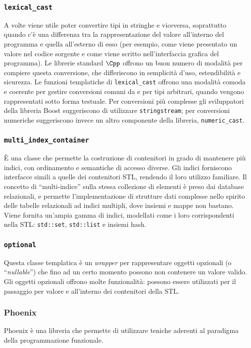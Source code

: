 \subsubsection{{\tt lexical\_cast}}
A volte viene utile poter convertire tipi in stringhe e viceversa,
soprattutto quando c'è una differenza tra la rappresentazione del valore
all'interno del programma e quella all'esterno di esso (per esempio,
come viene presentato un valore nel codice sorgente e come viene scritto
nell'interfaccia grafica del programma).
Le librerie standard $\Cpp$ offrono un buon numero di modalità per
compiere questa conversione, che differiscono in semplicità d'uso,
estendibilità e sicurezza.
Le funzioni templatiche di {\tt lexical\_cast} offrono una modalità
comoda e coerente per gestire conversioni comuni da e per tipi
arbitrari, quando vengono rappresentati sotto forma testuale.
Per conversioni più complesse gli sviluppatori della libreria Boost
suggeriscono di utilizzare {\tt stringstream}; per conversioni numeriche
suggeriscono invece un altro componente della libreria,
{\tt numeric\_cast}.

\subsubsection{{\tt multi\_index\_container}}
È una classe che permette la costruzione di contenitori in grado di
mantenere più indici, con ordinamento e semantiche di accesso diverse.
Gli indici forniscono interfacce simili a quelle dei contenitori STL,
rendendo il loro utilizzo familiare.
Il concetto di ``multi-indice'' sulla stessa collezione di elementi è
preso dai database relazionali, e permette l'implementazione di
strutture dati complesse nello spirito delle tabelle relazionali ad
indici multipli, dove insiemi e mappe non bastano.
Viene fornita un'ampia gamma di indici, modellati come i loro
corrispondenti nella STL: {\tt std::set}, {\tt std::list} e insiemi
hash.

\subsubsection{{\tt optional}}
Questa classe templatica è un \textit{wrapper} per rappresentare oggetti
opzionali (o ``\textit{nullable}'') che fino ad un certo momento possono
non contenere un valore valido.
Gli oggetti opzionali offrono molte funzionalità: possono essere
utilizzati per il passaggio per valore e all'interno dei contenitori
della STL.

\subsubsection{Phoenix}
Phoenix è una libreria che permette di utilizzare teniche aderenti al
paradigma della programmazione funzionale.

